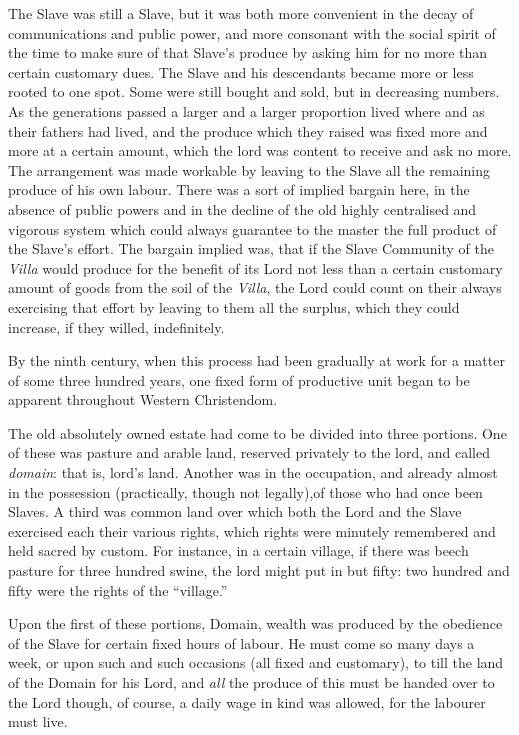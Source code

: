 \documentclass{book}
\begin{document}
The Slave was still a Slave, but it was both more convenient in the decay of communications and public power, and more consonant with the social spirit of the time to make sure of that Slave’s produce by asking him for no more than certain customary dues. The Slave and his descendants became more or less rooted to one spot. Some were still bought and sold, but in decreasing numbers. As the generations passed a larger and a larger proportion lived where and as their fathers had lived, and the produce which they raised was fixed more and more at a certain amount, which the lord was content to receive and ask no more. The arrangement was made workable by leaving to the Slave all the remaining produce of his own labour. There was a sort of implied bargain here, in the absence of public powers and in the decline of the old highly centralised and vigorous system which could always guarantee to the master the full product of the Slave’s effort. The bargain implied was, that if the Slave Community of the \emph{Villa} would produce for the benefit of its Lord not less than a certain customary amount of goods from the soil of the \emph{Villa}, the Lord could count on their always exercising that effort by leaving to them all the surplus, which they could increase, if they willed, indefinitely.

By the ninth century, when this process had been gradually at work for a matter of some three hundred years, one fixed form of productive unit began to be apparent throughout Western Christendom.

The old absolutely owned estate had come to be divided into three portions. One of these was pasture and arable land, reserved privately to the lord, and called \emph{domain}: that is, lord’s land. Another was in the occupation, and already almost in the possession (practically, though not legally),of those who had once been Slaves. A third was common land over which both the Lord and the Slave exercised each their various rights, which rights were minutely remembered and held sacred by custom. For instance, in a certain village, if there was beech pasture for three hundred swine, the lord might put in but fifty: two hundred and fifty were the rights of the “village.”

Upon the first of these portions, Domain, wealth was produced by the obedience of the Slave for certain fixed hours of labour. He must come so many days a week, or upon such and such occasions (all fixed and customary), to till the land of the Domain for his Lord, and \emph{all} the produce of this must be handed over to the Lord though, of course, a daily wage in kind was allowed, for the labourer must live.
\end{document}
